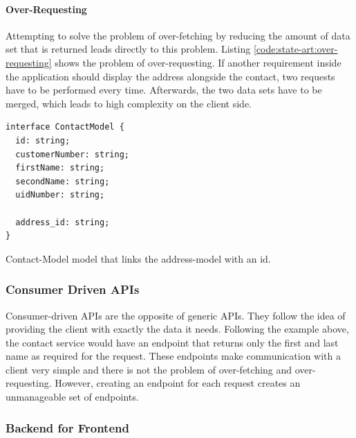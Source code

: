 \paragraph{Over-Requesting}

Attempting to solve the problem of over-fetching by reducing the amount of data set that is returned leads directly to this problem. Listing \ref{code:state-art:over-requesting} shows the problem of over-requesting. If another requirement inside the application should display the address alongside the contact, two requests have to be performed every time. Afterwards, the two data sets have to be merged, which leads to high complexity on the client side. \cite{misc:2019:leitner:backend-for-frontends}

\ifshowListings
\begin{listing}[H]
\begin{verbatim}
interface ContactModel {
  id: string;
  customerNumber: string;
  firstName: string;
  secondName: string;
  uidNumber: string;

  address_id: string;
}
\end{verbatim}
\caption{Contact-Model model that links the address-model with an id.}\label{code:state-art:over-requesting}
\end{listing}
\fi

\subsubsection{Consumer Driven APIs}

Consumer-driven APIs are the opposite of generic APIs. They follow the idea of providing the client with exactly the data it needs. Following the example above, the contact service would have an endpoint that returns only the first and last name as required for the request. These endpoints make communication with a client very simple and there is not the problem of over-fetching and over-requesting. However, creating an endpoint for each request creates an unmanageable set of endpoints. \cite{misc:2019:leitner:backend-for-frontends}

\subsubsection{Backend for Frontend}

\ifshowUnusedContent

